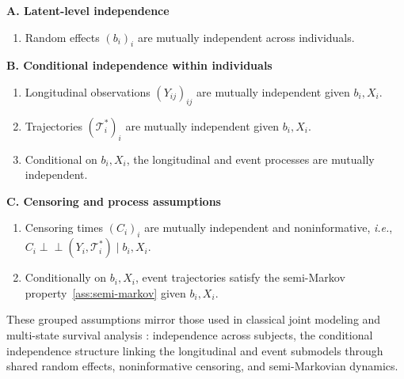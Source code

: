 \documentclass{sn-jnl}
\newcommand{\indep}{\mathrel{\perp\!\!\!\perp}}
\begin{document}
\begin{tcolorbox}[title=\textbf{Assumptions for Likelihood Factorization}, colback=gray!4!white,colframe=gray!60!black,sharp corners,boxrule=0.5pt] \label{ass:likelihood}
    \textbf{A. Latent-level independence}
    \vspace{-1em}
    \begin{enumerate}[label=\textbf{A\arabic*.}, leftmargin=3em]
        \item Random effects $(b_i)_i$ are mutually independent across individuals.
    \end{enumerate}
    \vspace{-0.5em}
    \textbf{B. Conditional independence within individuals}
    \vspace{-1em}
    \begin{enumerate}[label=\textbf{B\arabic*.}, leftmargin=3em]
        \item Longitudinal observations $(Y_{ij})_{ij}$ are mutually independent given $b_i, X_i$.
        \item Trajectories $(\mathcal{T}_i^*)_i$ are mutually independent given $b_i, X_i$.
        \item Conditional on $b_i, X_i$, the longitudinal and event processes are mutually independent.
    \end{enumerate}
    \vspace{-0.5em}
    \textbf{C. Censoring and process assumptions}
    \vspace{-1em}
    \begin{enumerate}[label=\textbf{C\arabic*.}, leftmargin=3em]
        \item[\textbf{C1.}] Censoring times $(C_i)_i$ are mutually independent and noninformative, \textit{i.e.}, $C_i \indep (Y_i, \mathcal{T}_i^*) \mid b_i, X_i$.
        \item[\textbf{C2.}] Conditionally on $b_i, X_i$, event trajectories satisfy the semi-Markov property~\ref{ass:semi-markov} given $b_i, X_i$.
    \end{enumerate}
\end{tcolorbox}

These grouped assumptions mirror those used in classical joint modeling \citep{rizopoulos2012joint} and multi-state survival analysis \citep{putter2007competing}: independence across subjects, the conditional independence structure linking the longitudinal and event submodels through shared random effects, noninformative censoring, and semi-Markovian dynamics.

\bigbreak
\end{document}
